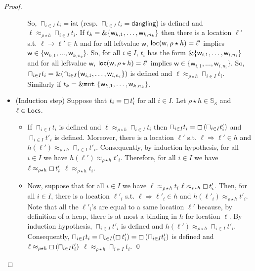 \begin{proof}
\begin{itemize}
\begin{itemize}
      So, $\sqcap_{i\in I}t_i = \mathsf{int}$
      (resp. $\sqcap_{i\in I}t_i=\mathsf{dangling}$) is defined and
      $\ell\approx_{\rho\star h}\sqcap_{i\in I}t_i$.
      If $t_k=\&\{\mathsf{w}_{k,1},\ldots,\mathsf{w}_{k,n_k}\}$
      then there is a location $\ell'$ s.t. $\ell\to\ell'\in h$
      and for all leftvalue $\mathsf{w}$,
      $\mathsf{loc}(\mathsf{w},\rho\star h)=\ell'$
      implies $\mathsf{w}\in\{\mathsf{w}_{k,1},\ldots,\mathsf{w}_{k,n_k}\}$.
      So, for all $i\in I$, $t_i$ has the form
      $\&\{\mathsf{w}_{i,1},\ldots,\mathsf{w}_{i,n_i}\}$
      and for all leftvalue $\mathsf{w}$, $\mathsf{loc}(\mathsf{w},\rho\star h)=\ell'$
      implies $\mathsf{w}\in\{\mathsf{w}_{i,1},\ldots,\mathsf{w}_{i,n_i}\}$. So,
      $\sqcap_{i\in I}t_i = \&(\cap_{i\in I}\{\mathsf{w}_{i,1},\ldots,\mathsf{w}_{i,n_i}\})$
      is defined and $\ell\approx_{\rho\star h}\sqcap_{i\in I}t_i$.
      Similarly if $t_k=\&\mathtt{mut}\ \{\mathsf{w}_{k,1},\ldots,\mathsf{w}_{k,n_k}\}$.
    \end{itemize}
    \item (Induction step) Suppose that $t_i=\boxempty\,{t'_i}$ for all
    $i\in I$. Let $\rho\star h\in\mathbb{S}_\kappa$ and $\ell\in\mathsf{Locs}$.
    \begin{itemize}
      \item If $\sqcap_{i\in I}t_i$ is defined and
      $\ell\approx_{\rho\star h}\sqcap_{i\in I}t_i$ then
      $\sqcap_{i\in I}t_i = \boxempty\,{(\sqcap_{i\in I}t'_i)}$ and
      $\sqcap_{i\in I}t'_i$ is defined. Moreover, there is a location $\ell'$
      s.t. $\ell\Rightarrow\ell'\in h$ and
      $h(\ell')\approx_{\rho\star h}\sqcap_{i\in I}t'_i$. Consequently,
      by induction hypothesis, for all $i\in I$ we have
      $h(\ell')\approx_{\rho\star h}t'_i$. Therefore, for all $i\in I$ we have
      $\ell\approx_{\rho\star h}\boxempty\,{t'_i}$ \ie
      $\ell\approx_{\rho\star h}t_i$.
      \item Now, suppose that for all $i\in I$ we have $\ell\approx_{\rho\star h}t_i$
      \ie $\ell\approx_{\rho\star h}\boxempty\,{t'_i}$. Then, for all $i\in I$,
      there is a location $\ell'_i$ s.t. $\ell\Rightarrow\ell'_i\in h$ and
      $h(\ell'_i)\approx_{\rho\star h}t'_i$.
      Note that all the $\ell'_i$'s are equal to a same location $\ell'$ because,
      by definition of a heap, there is at most a binding in $h$ for location
      $\ell$. By induction hypothesis, $\sqcap_{i\in I}t'_i$ is defined and
      $h(\ell')\approx_{\rho\star h}\sqcap_{i\in I}t'_i$.
      Consequently, $\sqcap_{i\in I}t_i = \sqcap_{i\in I} (\boxempty\,{t'_i}) =
      \boxempty\,{(\sqcap_{i\in I}t'_i)}$ is defined and
      $\ell\approx_{\rho\star h}\boxempty\,{(\sqcap_{i\in I}t'_i)}$ \ie
      $\ell\approx_{\rho\star h}\sqcap_{i\in I}t_i$.
      \qed
    \end{itemize}
  \end{itemize}
\end{proof}

